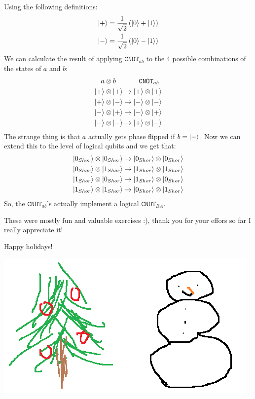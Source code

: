 \documentclass[12pt]{article}
\newcommand{\rsqrt}[1]{\ensuremath{\frac{1}{\sqrt{#1}}}}
\newenvironment{answer}{\begingroup\setlength{\leftskip}{-\leftmargin}\begin{framed}}{\end{framed}\endgroup}
\newcommand{\CNOT}[1]{\ensuremath{\texttt{CNOT}_{#1}}}
\begin{document}
\begin{enumerate}
\begin{answer}
        Using the following definitions:
        \begin{align*}
            \ket{+} = \rsqrt{2}\left(\ket{0} + \ket{1}\right) \\
            \ket{-} = \rsqrt{2}\left(\ket{0} - \ket{1}\right)
        \end{align*}
        We can calculate the result of applying \CNOT{ab} to the 4 possible combinations of the states of $a$ and $b$:
        \begin{align*}
            a \otimes b ~~~& ~~~~~~~\CNOT{ab} \\
            \ket{+} \otimes \ket{+} & \rightarrow \ket{+} \otimes \ket{+} \\
            \ket{+} \otimes \ket{-} & \rightarrow \ket{-} \otimes \ket{-} \\
            \ket{-} \otimes \ket{+} & \rightarrow \ket{-} \otimes \ket{+} \\
            \ket{-} \otimes \ket{-} & \rightarrow \ket{+} \otimes \ket{-}
        \end{align*}
        The strange thing is that $a$ actually gets phase flipped if $b = \ket{-}$.
        Now we can extend this to the level of logical qubits and we get that:
        \begin{align*}
            \ket{0_{Shor}} \otimes \ket{0_{Shor}} &\rightarrow \ket{0_{Shor}} \otimes \ket{0_{Shor}} \\
            \ket{0_{Shor}} \otimes \ket{1_{Shor}} &\rightarrow \ket{1_{Shor}} \otimes \ket{1_{Shor}} \\
            \ket{1_{Shor}} \otimes \ket{0_{Shor}} &\rightarrow \ket{1_{Shor}} \otimes \ket{0_{Shor}} \\
            \ket{1_{Shor}} \otimes \ket{1_{Shor}} &\rightarrow \ket{0_{Shor}} \otimes \ket{1_{Shor}}
        \end{align*}
        So, the \CNOT{ab}'s actually implement a logical \CNOT{BA}.
    \end{answer}
\end{enumerate}

These were mostly fun and valuable exercises :), thank you for your effors so far I really appreciate it!

Happy holidays!

\begin{center}\includegraphics[width=.4\textwidth]{happy-holidays.png}\end{center}
\end{document}
